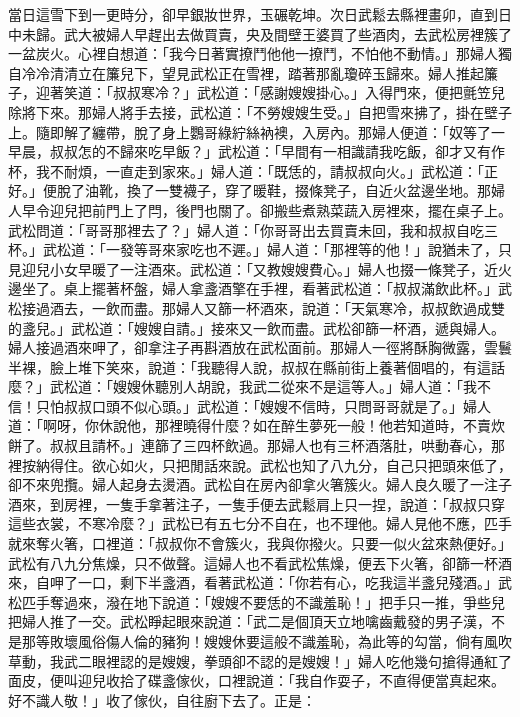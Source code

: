 當日這雪下到一更時分，卻早銀妝世界，玉碾乾坤。次日武鬆去縣裡畫卯，直到日中未歸。武大被婦人早趕出去做買賣，央及間壁王婆買了些酒肉，去武松房裡簇了一盆炭火。心裡自想道：「我今日著實撩鬥他他一撩鬥，不怕他不動情。」那婦人獨自冷冷清清立在簾兒下，望見武松正在雪裡，踏著那亂瓊碎玉歸來。婦人推起簾子，迎著笑道：「叔叔寒冷？」武松道：「感謝嫂嫂掛心。」入得門來，便把氈笠兒除將下來。那婦人將手去接，武松道：「不勞嫂嫂生受。」自把雪來拂了，掛在壁子上。隨即解了纏帶，脫了身上鸚哥綠紵絲衲襖，入房內。那婦人便道：「奴等了一早晨，叔叔怎的不歸來吃早飯？」武松道：「早間有一相識請我吃飯，卻才又有作杯，我不耐煩，一直走到家來。」婦人道：「既恁的，請叔叔向火。」武松道：「正好。」便脫了油靴，換了一雙襪子，穿了暖鞋，掇條凳子，自近火盆邊坐地。那婦人早令迎兒把前門上了閂，後門也關了。卻搬些煮熟菜蔬入房裡來，擺在桌子上。武松問道：「哥哥那裡去了？」婦人道：「你哥哥出去買賣未回，我和叔叔自吃三杯。」武松道：「一發等哥來家吃也不遲。」婦人道：「那裡等的他！」說猶未了，只見迎兒小女早暖了一注酒來。武松道：「又教嫂嫂費心。」婦人也掇一條凳子，近火邊坐了。桌上擺著杯盤，婦人拿盞酒擎在手裡，看著武松道：「叔叔滿飲此杯。」武松接過酒去，一飲而盡。那婦人又篩一杯酒來，說道：「天氣寒冷，叔叔飲過成雙的盞兒。」武松道：「嫂嫂自請。」接來又一飲而盡。武松卻篩一杯酒，遞與婦人。婦人接過酒來呷了，卻拿注子再斟酒放在武松面前。那婦人一徑將酥胸微露，雲鬟半裸，臉上堆下笑來，說道：「我聽得人說，叔叔在縣前街上養著個唱的，有這話麼？」武松道：「嫂嫂休聽別人胡說，我武二從來不是這等人。」婦人道：「我不信！只怕叔叔口頭不似心頭。」武松道：「嫂嫂不信時，只問哥哥就是了。」婦人道：「啊呀，你休說他，那裡曉得什麼？如在醉生夢死一般！他若知道時，不賣炊餅了。叔叔且請杯。」連篩了三四杯飲過。那婦人也有三杯酒落肚，哄動春心，那裡按納得住。欲心如火，只把閒話來說。武松也知了八九分，自己只把頭來低了，卻不來兜攬。婦人起身去燙酒。武松自在房內卻拿火箸簇火。婦人良久暖了一注子酒來，到房裡，一隻手拿著注子，一隻手便去武鬆肩上只一捏，說道：「叔叔只穿這些衣裳，不寒冷麼？」武松已有五七分不自在，也不理他。婦人見他不應，匹手就來奪火箸，口裡道：「叔叔你不會簇火，我與你撥火。只要一似火盆來熱便好。」武松有八九分焦燥，只不做聲。這婦人也不看武松焦燥，便丟下火箸，卻篩一杯酒來，自呷了一口，剩下半盞酒，看著武松道：「你若有心，吃我這半盞兒殘酒。」武松匹手奪過來，潑在地下說道：「嫂嫂不要恁的不識羞恥！」把手只一推，爭些兒把婦人推了一交。武松睜起眼來說道：「武二是個頂天立地噙齒戴發的男子漢，不是那等敗壞風俗傷人倫的豬狗！嫂嫂休要這般不識羞恥，為此等的勾當，倘有風吹草動，我武二眼裡認的是嫂嫂，拳頭卻不認的是嫂嫂！」婦人吃他幾句搶得通紅了面皮，便叫迎兒收拾了碟盞傢伙，口裡說道：「我自作耍子，不直得便當真起來。好不識人敬！」收了傢伙，自往廚下去了。正是：

